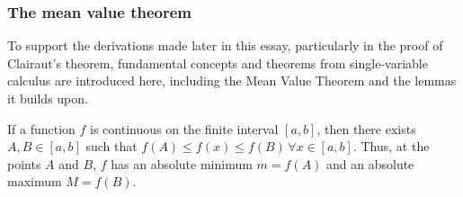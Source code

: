 \subsubsection{The mean value theorem}\label{section:MVT}
To support the derivations made later in this essay, particularly in the proof of Clairaut's theorem, fundamental
concepts and theorems from single-variable calculus are introduced here, including the Mean Value Theorem and the lemmas it builds upon.
\begin{lemma}\label{lemma:MINMAX}
	If a function $f$ is continuous on the finite interval $[a,b]$, then there exists $A,B\in[a,b]$ such that $f(A)\leq f(x)\leq f(B)\,\forall x\in[a,b]$.
	Thus, at the points $A$ and $B$, $f$ has an absolute minimum $m=f(A)$ and an absolute maximum $M=f(B)$.
\end{lemma}
